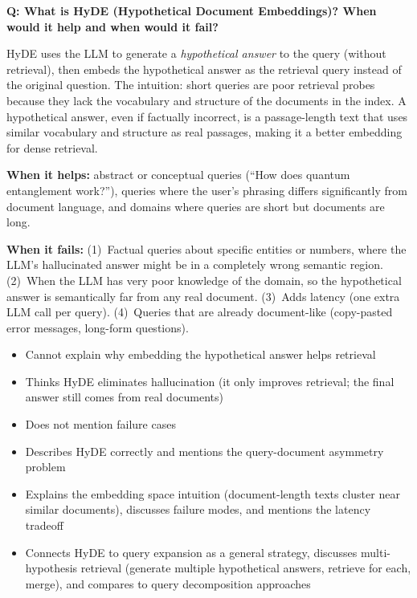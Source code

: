 \begin{interviewq}
\textbf{Q: What is HyDE (Hypothetical Document Embeddings)? When would it help
and when would it fail?}

 \quad {} \quad \badgefreq{\freqmed}

\stronganswer
HyDE uses the LLM to generate a \emph{hypothetical answer} to the query
(without retrieval), then embeds the hypothetical answer as the retrieval
query instead of the original question.  The intuition: short queries are
poor retrieval probes because they lack the vocabulary and structure of the
documents in the index.  A hypothetical answer, even if factually incorrect,
is a passage-length text that uses similar vocabulary and structure as real
passages, making it a better embedding for dense retrieval.

\textbf{When it helps:} abstract or conceptual queries (``How does quantum
entanglement work?''), queries where the user's phrasing differs significantly
from document language, and domains where queries are short but documents are
long.

\textbf{When it fails:} (1)~Factual queries about specific entities or numbers,
where the LLM's hallucinated answer might be in a completely wrong semantic
region.  (2)~When the LLM has very poor knowledge of the domain, so the
hypothetical answer is semantically far from any real document.  (3)~Adds
latency (one extra LLM call per query).  (4)~Queries that are already
document-like (copy-pasted error messages, long-form questions).

\redflags
\begin{itemize}
    \item Cannot explain why embedding the hypothetical answer helps retrieval
    \item Thinks HyDE eliminates hallucination (it only improves retrieval;
          the final answer still comes from real documents)
    \item Does not mention failure cases
\end{itemize}


\goodgreat
\begin{itemize}
    \item {} Describes HyDE correctly and mentions the query-document
          asymmetry problem
    \item {} Explains the embedding space intuition (document-length
          texts cluster near similar documents), discusses failure modes, and
          mentions the latency tradeoff
    \item {} Connects HyDE to query expansion as a general strategy,
          discusses multi-hypothesis retrieval (generate multiple hypothetical
          answers, retrieve for each, merge), and compares to query decomposition
          approaches
\end{itemize}


\end{interviewq}
